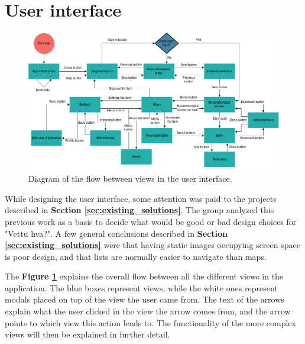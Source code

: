 \section{User interface}


\begin{figure}[h!]
	\centering
	\includegraphics[width=\textwidth]{fig/flow_diagram}
	\caption{Diagram of the flow between views in the user interface.}
	\label{Fig:flow_diagram}
\end{figure}

While designing the user interface, some attention was paid to the projects described in \textbf{Section \ref{sec:existing_solutions}}. The group analyzed this previous work as a basis to decide what would be good or bad design choices for "Vettu hva?". A few general conclusions described in \textbf{Section \ref{sec:existing_solutions}} were that having static images occupying screen space is poor design, and that lists are normally easier to navigate than maps.\newline

The \textbf{Figure \ref{Fig:flow_diagram}} explains the overall flow between all the different views in the application. The blue boxes represent views, while the white ones represent modals placed on top of the view the user came from. The text of the arrows explain what the user clicked in the view the arrow comes from, and the arrow points to which view this action leads to.  The functionality of the more complex views will then be explained in further detail.



